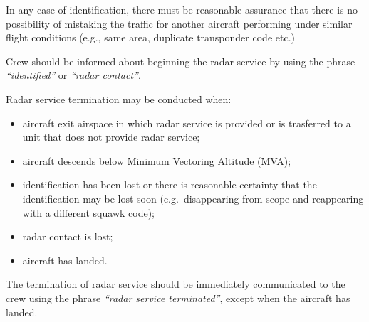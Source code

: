In any case of identification, there must be reasonable assurance that there is no possibility of mistaking the traffic for another aircraft performing under similar flight conditions (e.g., same area, duplicate transponder code etc.)

Crew should be informed about beginning the radar service by using the phrase \textit{``identified''} or \textit{``radar contact''}.

Radar service termination may be conducted when:
\begin{itemize}
    \item aircraft exit airspace in which radar service is provided or is trasferred to a unit that does not provide radar service;
    \item aircraft descends below Minimum Vectoring Altitude (MVA);
    \item identification has been lost or there is reasonable certainty that the identification may be lost soon (e.g.~disappearing from scope and reappearing with a different squawk code);
    \item radar contact is lost;
    \item aircraft has landed.
\end{itemize}

The termination of radar service should be immediately communicated to the crew using the phrase \textit{``radar service terminated''}, except when the aircraft has landed.